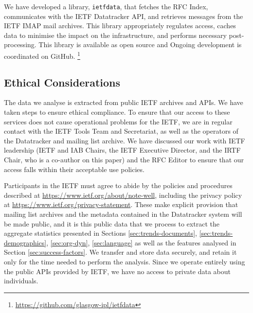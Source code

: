 \documentclass[twocolumn,10pt]{article}
\newcommand{\pb}[1]{\vspace{0.75ex}\noindent{\textbf{#1}}}
\begin{document}

\pb{Reproducibility and data access:}
We have developed a library, \texttt{ietfdata}, that fetches the RFC
Index, communicates with the IETF Datatracker API, and retrieves messages
from the IETF IMAP mail archives. This library appropriately regulates
access, caches data to minimise the impact on the infrastructure, and
performs necessary post-processing. This library is available as open
source and Ongoing development is coordinated on GitHub.%
\footnote{\url{https://github.com/glasgow-ipl/ietfdata}}


\subsection{Ethical Considerations}
\label{sec:ethics}


The data we analyse is extracted from public IETF archives and APIs.  We
have taken steps to ensure ethical compliance.  To ensure that our access
to these services does not cause operational problems for the IETF, we are
in regular contact with the IETF Tools Team and Secretariat, as well as the
operators of the Datatracker and mailing list archive.  We have
discussed our work with IETF leadership (IETF and IAB Chairs, the IETF
Executive Director, and the IRTF Chair, who is a co-author on this paper)
and the RFC Editor to ensure that our access falls within their acceptable
use policies.

Participants in the IETF must agree to abide by the policies and procedures
described at \url{https://www.ietf.org/about/note-well}, including the privacy
policy at \url{https://www.ietf.org/privacy-statement}. These make explicit
provision that mailing list archives and the metadata contained in the
Datatracker system will be made public, and it is this public data that
we process to extract the aggregate statistics presented in Sections
\ref{sec:trends-documents}, \ref{sec:trends-demographics}, \ref{sec:org-dyn},
\ref{sec:language} as well as the features analysed in Section
\ref{sec:success-factors}. We transfer and store data securely, and retain
it only for the time needed to perform the analysis.  Since we operate
entirely using the public APIs provided by IETF, we have no access to
private data about individuals.
\end{document}
